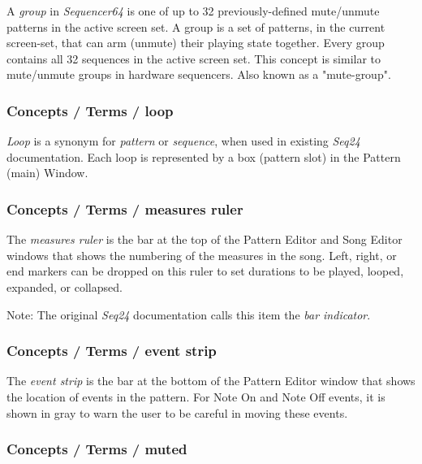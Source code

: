    A \textsl{group} in \textsl{Sequencer64} is one of up to 32
   previously-defined mute/unmute patterns in the active screen set.
   A group is a set of patterns, in the current screen-set,
   that can arm (unmute) their playing state
   together.  Every group contains all 32 sequences in the active screen
   set.  This concept is similar to mute/unmute groups in hardware
   sequencers.
   Also known as a "mute-group".

\subsubsection{Concepts / Terms / loop}
\label{subsubsec:concepts_terms_loop}

   \textsl{Loop}
   is a synonym for \textsl{pattern} or \textsl{sequence}, when used
   in existing \textsl{Seq24} documentation.
   Each loop is represented by a box (pattern slot) in the Pattern (main)
   Window.

\subsubsection{Concepts / Terms / measures ruler}
\label{subsubsec:concepts_terms_measures_ruler}

   The \textsl{measures ruler} is the bar at the top of the Pattern Editor
   and Song Editor windows that shows the numbering of the measures in the
   song.  Left, right, or end markers can be dropped on this ruler to set
   durations to be played, looped, expanded, or collapsed.

   Note:
   The original \textsl{Seq24} documentation calls this item the
   \textsl{bar indicator}.

\subsubsection{Concepts / Terms / event strip}
\label{subsubsec:concepts_terms_event_strip}

   The \textsl{event strip} is the bar at the bottom of the Pattern Editor
   window that shows the location of events in the pattern.
   For Note On and Note Off events, it is shown in gray to warn the user to be
   careful in moving these events.

\subsubsection{Concepts / Terms / muted}
\label{subsubsec:concepts_terms_muted}

